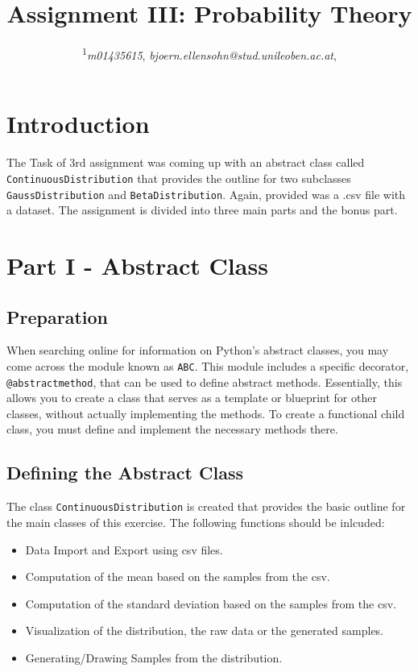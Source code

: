 \documentclass{CPSReport}
\title{Assignment III: Probability Theory} %
\author{
	\coursetitle{Introduction to Machine Learning Lab (190.013), SS2023}
	\authorstyle{Björn Ellensohn\textsuperscript{1}} %
	\newline\newline %
	\textsuperscript{1}\textit{m01435615}, \textit{bjoern.ellensohn@stud.unileoben.ac.at}, \institution{Montanuniversität Leoben, Austria}\\ %
	\submissiondate{\today} %
}
\begin{document}
\maketitle %

\thispagestyle{firstpage} %



\section{Introduction}
The Task of 3rd assignment was coming up with an abstract class called \texttt{ContinuousDistribution} that provides the outline for two subclasses \texttt{GaussDistribution} and \texttt{BetaDistribution}.
Again, provided was a .csv file with a dataset.
The assignment is divided into three main parts and the bonus part.

\section{Part I - Abstract Class}
\subsection{Preparation}
When searching online for information on Python's abstract classes, you may come across the module known as \texttt{ABC}. This module includes a specific decorator, \texttt{@abstractmethod}, that can be used to define abstract methods. Essentially, this allows you to create a class that serves as a template or blueprint for other classes, without actually implementing the methods. To create a functional child class, you must define and implement the necessary methods there.

\subsection{Defining the Abstract Class}
The class \texttt{ContinuousDistribution} is created that provides the basic outline for the main classes of this exercise. The following functions should be inlcuded:
\begin{itemize}
    \item Data Import and Export using csv files.
    \item Computation of the mean based on the samples from the csv.
    \item Computation of the standard deviation based on the samples from the csv.
    \item Visualization of the distribution, the raw data or the generated samples.
    \item Generating/Drawing Samples from the distribution. 
\end{itemize}
\end{document}
